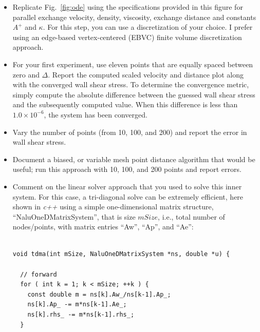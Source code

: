 \documentclass{article}
\begin{document}
\begin{itemize}

\item Replicate Fig.~\ref{fig:ode} using the specifications provided in this figure for parallel exchange 
velocity, density, viscosity, exchange distance and constants $A^+$ and $\kappa$. For this step, you can 
use a discretization of your choice. I prefer using an edge-based vertex-centered (EBVC) finite volume discretization
approach. 

\item For your first experiment, use eleven points that are equally spaced between zero and $\Delta$. Report
the computed scaled velocity and distance plot along with the converged wall shear stress. To determine the 
convergence metric, simply compute the absolute difference between the guessed wall shear stress and the 
subsequently computed value. When this difference is less than $1.0 \times 10^{-6}$, the system has been
converged. 

\item Vary the number of points (from 10, 100, and 200) and report the error in wall shear stress. 

\item Document a biased, or variable mesh point distance algorithm that would be useful; run this approach
with 10, 100, and 200 points and report errors.

\item Comment on the linear solver approach that you used to solve this inner system. For this case, 
a tri-diagonal solve can be extremely efficient, here shown in \emph{c++} using a simple one-dimensional 
matrix structure, ``NaluOneDMatrixSystem'', that is size $mSize$, i.e., total number of nodes/points, 
with matrix entries ``Aw'', ``Ap'', and ``Ae'':

\begin{lstlisting}[caption={This is a tri-diagonal implicit matrix solve routine (also
known as the Thomas Algorithm) and is suitable for solving a diagnonal dominant matrix system. For structured
three-dimensional applications, alternating sweep directions can be combined with the tri-diagonal solve. In this 
implementation, the matrix coefficients are modified and are not intended to be re-used for each subsequent 
iteration.},captionpos=b]

void tdma(int mSize, NaluOneDMatrixSystem *ns, double *u) {
  
  // forward
  for ( int k = 1; k < mSize; ++k ) {
    const double m = ns[k].Aw_/ns[k-1].Ap_;
    ns[k].Ap_ -= m*ns[k-1].Ae_;
    ns[k].rhs_ -= m*ns[k-1].rhs_;
  }


\end{lstlisting}
\end{itemize}
\end{document}
